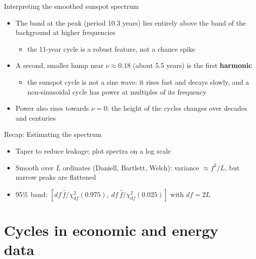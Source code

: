 \begin{frame}{Interpreting the smoothed sunspot spectrum}
\itemsize{\small}
\begin{itemize}
    \item The band at the peak (period 10.3 years) lies entirely above the band of the background at higher frequencies
    \begin{itemize}
        \item the 11-year cycle is a robust feature, not a chance spike
    \end{itemize}
    \item A second, smaller hump near $\nu \approx 0.18$ (about 5.5 years) is the first \textbf{harmonic}
    \begin{itemize}
        \item the sunspot cycle is not a sine wave: it rises fast and decays slowly, and a non-sinusoidal cycle has power at multiples of its frequency
    \end{itemize}
    \item Power also rises towards $\nu = 0$: the height of the cycles changes over decades and centuries
\end{itemize}
\end{frame}

\begin{frame}{Recap: Estimating the spectrum}
\itemsize{\small}
\begin{itemize}
    \item Taper to reduce leakage; plot spectra on a log scale
    \item Smooth over $L$ ordinates (Daniell, Bartlett, Welch): variance $\approx f^2/L$, but narrow peaks are flattened
    \item 95\% band: $[df\,\hat f/\chi^2_{df}(0.975),\ df\,\hat f/\chi^2_{df}(0.025)]$ with $df = 2L$
\end{itemize}
\end{frame}


\section{Cycles in economic and energy data}

